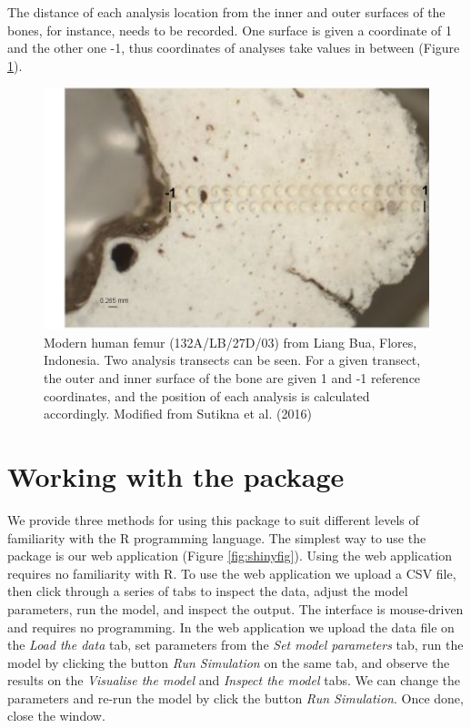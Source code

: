 \documentclass[]{elsarticle} %
\begin{document}
The distance of each analysis location from the inner and outer surfaces of the bones, for instance, needs to be recorded. One surface is given a coordinate of 1 and the other one -1, thus coordinates of analyses take values in between (Figure \ref{fig:femurpic}).



\begin{figure}
\includegraphics[width=0.95\linewidth]{figures/bone} \caption{Modern human femur (132A/LB/27D/03) from Liang Bua, Flores, Indonesia. Two analysis transects can be seen. For a given transect, the outer and inner surface of the bone are given 1 and -1 reference coordinates, and the position of each analysis is calculated accordingly. Modified from Sutikna et al. (2016)}\label{fig:femurpic}
\end{figure}

\FloatBarrier

\hypertarget{working-with-the-package}{%
\section{Working with the package}\label{working-with-the-package}}

We provide three methods for using this package to suit different levels of familiarity with the R programming language. The simplest way to use the package is our web application (Figure \ref{fig:shinyfig}). Using the web application requires no familiarity with R. To use the web application we upload a CSV file, then click through a series of tabs to inspect the data, adjust the model parameters, run the model, and inspect the output. The interface is mouse-driven and requires no programming. In the web application we upload the data file on the \emph{Load the data} tab, set parameters from the \emph{Set model parameters} tab, run the model by clicking the button \emph{Run Simulation} on the same tab, and observe the results on the \emph{Visualise the model} and \emph{Inspect the model} tabs. We can change the parameters and re-run the model by click the button \emph{Run Simulation}. Once done, close the window.
\end{document}
